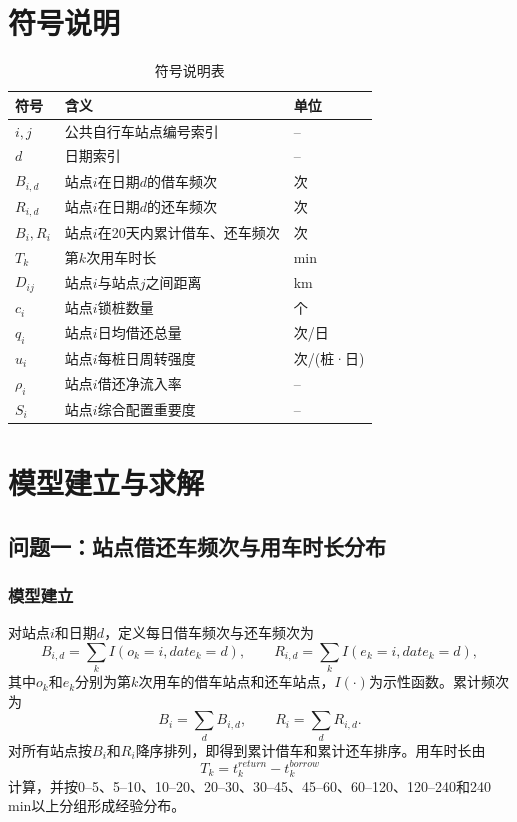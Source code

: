 \documentclass[UTF8,a4paper,12pt]{ctexart}
\begin{document}
\section{符号说明}
\begin{longtable}{p{}p{}p{}}
\caption{符号说明表}\\
\toprule
符号 & 含义 & 单位\\
\midrule
$i,j$ & 公共自行车站点编号索引 & --\\
$d$ & 日期索引 & --\\
$B_{i,d}$ & 站点$i$在日期$d$的借车频次 & 次\\
$R_{i,d}$ & 站点$i$在日期$d$的还车频次 & 次\\
$B_i,R_i$ & 站点$i$在20天内累计借车、还车频次 & 次\\
$T_k$ & 第$k$次用车时长 & min\\
$D_{ij}$ & 站点$i$与站点$j$之间距离 & km\\
$c_i$ & 站点$i$锁桩数量 & 个\\
$q_i$ & 站点$i$日均借还总量 & 次/日\\
$u_i$ & 站点$i$每桩日周转强度 & 次/(桩·日)\\
$\rho_i$ & 站点$i$借还净流入率 & --\\
$S_i$ & 站点$i$综合配置重要度 & --\\
\bottomrule
\end{longtable}

\section{模型建立与求解}
\subsection{问题一：站点借还车频次与用车时长分布}
\subsubsection{模型建立}
对站点$i$和日期$d$，定义每日借车频次与还车频次为
\begin{equation}
B_{i,d}=\sum_k I(o_k=i,date_k=d),\qquad R_{i,d}=\sum_k I(e_k=i,date_k=d),
\end{equation}
其中$o_k$和$e_k$分别为第$k$次用车的借车站点和还车站点，$I(\cdot)$为示性函数。累计频次为
\begin{equation}
B_i=\sum_d B_{i,d},\qquad R_i=\sum_d R_{i,d}.
\end{equation}
对所有站点按$B_i$和$R_i$降序排列，即得到累计借车和累计还车排序。用车时长由
\begin{equation}
T_k=t^{return}_k-t^{borrow}_k
\end{equation}
计算，并按0--5、5--10、10--20、20--30、30--45、45--60、60--120、120--240和240 min以上分组形成经验分布。
\end{document}
